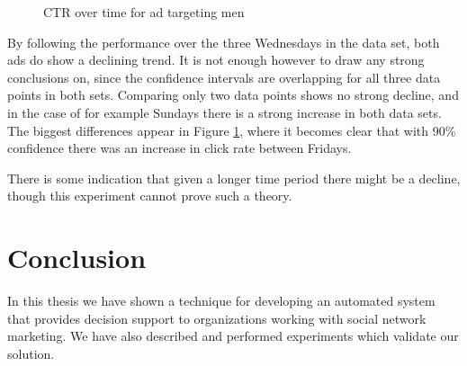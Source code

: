 \documentclass{sig-alternate}
\begin{document}
\begin{figure}[htb]
\begin{center}

	\caption{CTR over time for ad targeting men}
	\label{fig:TimeInfluence2}
\end{center}
\end{figure}

By following the performance over the three Wednesdays in the data set, both ads do show a declining trend. It is not enough however to draw any strong conclusions on, since the confidence intervals are overlapping for all three data points in both sets. Comparing only two data points shows no strong decline, and in the case of for example Sundays there is a strong increase in both data sets. The biggest differences appear in Figure \ref{fig:TimeInfluence2}, where it becomes clear that with 90\% confidence there was an increase in click rate between Fridays.

There is some indication that given a longer time period there might be a decline, though this experiment cannot prove such a theory.

\section{Conclusion}
\label{ch:Conclusion}
In this thesis we have shown a technique for developing an automated system that provides decision support to organizations working with social network marketing. We have also described and performed experiments which validate our solution.
\end{document}
